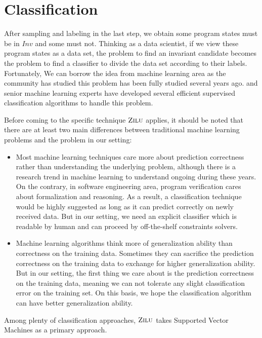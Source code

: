 
\section{Classification} %
\label{sec:classification}

After sampling and labeling in the last step, we obtain some program states must be in $Inv$ and some must not. 
Thinking as a data scientist, if we view these program states as a data set, 
the problem to find an invariant candidate becomes the problem to find a classifier to divide the data set according to their labels.
Fortunately, We can borrow the idea from machine learning area as the community has studied this problem has been fully studied several years ago.
and senior machine learning experts have developed several efficient supervised classification algorithms to handle this problem.

Before coming to the specific technique $\textsc{Zilu}$ applies,
it should be noted that there are at least two main differences between traditional machine learning problems and the problem in our setting:
\begin{itemize}
\item Most machine learning techniques care more about prediction correctness rather than understanding the underlying problem,
although there is a research trend in machine learning to understand ongoing during these years.
On the contrary, in software engineering area, program verification cares about formalization and reasoning.
As a result, a classification technique would be highly suggested as long as it can predict correctly on newly received data.
But in our setting, we need an explicit classifier which is readable by human and can proceed by off-the-shelf constraints solvers.
\item Machine learning algorithms think more of generalization ability than correctness on the training data.
Sometimes they can sacrifice the prediction correctness on the training data to exchange for higher generalization ability.
But in our setting, the first thing we care about is the prediction  correctness on the training data,
meaning we can not tolerate any slight classification error on the training set.
On this basis, we hope the classification algorithm can have better generalization ability.
\end{itemize} 

Among plenty of classification approaches, $\textsc{Zilu}$ takes Supported Vector Machines as a primary approach.

